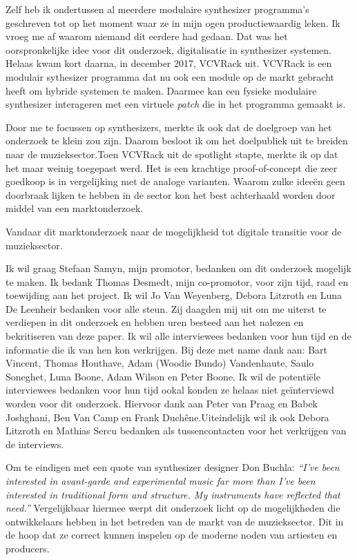 Zelf heb ik ondertussen al meerdere modulaire synthesizer programma's geschreven tot op het moment waar ze in mijn ogen productiewaardig leken. Ik vroeg me af waarom niemand dit eerdere had gedaan. Dat was het oorspronkelijke idee voor dit onderzoek, digitalisatie in synthesizer systemen. Helaas kwam kort daarna, in december 2017, VCVRack uit. VCVRack is een modulair sythesizer programma dat nu ook een module op de markt gebracht heeft om hybride systemen te maken. Daarmee kan een fysieke modulaire synthesizer interageren met een virtuele \textit{patch} die in het programma gemaakt is.

Door me te focussen op synthesizers, merkte ik ook dat de doelgroep van het onderzoek te klein zou zijn. Daarom besloot ik om het doelpubliek uit te breiden naar de muzieksector.\newline Toen VCVRack uit de spotlight stapte, merkte ik op dat het maar weinig toegepast werd. Het is een krachtige proof-of-concept die zeer goedkoop is in vergelijking met de analoge varianten. Waarom zulke ideeën geen doorbraak lijken te hebben in de sector kon het best achterhaald worden door middel van een marktonderzoek.

Vandaar dit marktonderzoek naar de mogelijkheid tot digitale transitie voor de muzieksector.

Ik wil graag Stefaan Samyn, mijn promotor, bedanken om dit onderzoek mogelijk te maken. Ik bedank Thomas Desmedt, mijn co-promotor, voor zijn tijd, raad en toewijding aan het project.\newline 
Ik wil Jo Van Weyenberg, Debora Litzroth en Luna De Leenheir bedanken voor alle steun. Zij daagden mij uit om me uiterst te verdiepen in dit onderzoek en hebben uren besteed aan het nalezen en bekritiseren van deze paper.\newline
Ik wil alle interviewees bedanken voor hun tijd en de informatie die ik van hen kon verkrijgen. Bij deze met name dank aan: Bart Vincent, Thomas Houthave, Adam (Woodie Bundo) Vandenhaute, Saulo Soneghet, Luna Boone, Adam Wilson en Peter Boone. Ik wil de potentiële interviewees bedanken voor hun tijd ookal konden ze helaas niet geïnterviewd worden voor dit onderzoek. Hiervoor dank aan Peter van Praag en Babek Joshghani, Ben Van Camp en Frank Duchêne.\newline Uiteindelijk wil ik ook Debora Litzroth en Mathias Sercu bedanken als tussencontacten voor het verkrijgen van de interviews.

Om te eindigen met een quote van synthesizer designer Don Buchla: \textit{``I've been interested in avant-garde and experimental music far more than I've been interested in traditional form and structure. My instruments have reflected that need.''} Vergelijkbaar hiermee werpt dit onderzoek licht op de mogelijkheden die ontwikkelaars hebben in het betreden van de markt van de muzieksector. Dit in de hoop dat ze correct kunnen inspelen op de moderne noden van artiesten en producers.



